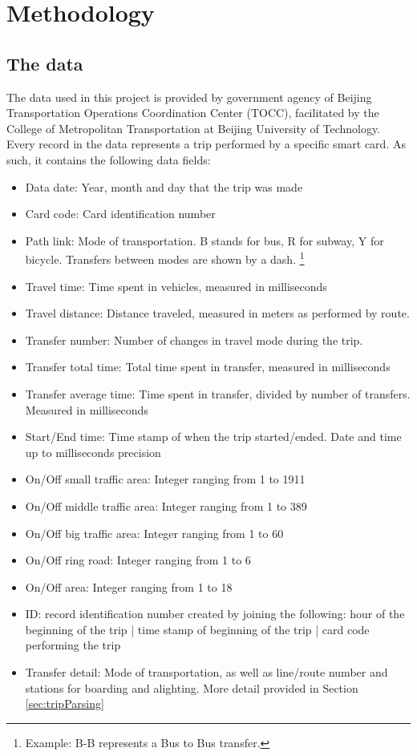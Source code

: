 \documentclass{article}
\begin{document}
\newpage
\section{Methodology}
\subsection{The data}
\label{sec:data}
The data used in this project is provided by government agency of Beijing Transportation Operations Coordination Center (TOCC), facilitated by the College of Metropolitan Transportation at Beijing University of Technology. Every record in the data represents a trip performed by a specific smart card. As such, it contains the following data fields:

\begin{itemize}
\item Data date: Year, month and day that the trip was made
\item Card code: Card identification number
\item Path link: Mode of transportation. B stands for bus, R for subway, Y for bicycle. Transfers between modes are shown by a dash. \footnote{Example: B-B represents a Bus to Bus transfer.} 
\item Travel time: Time spent in vehicles, measured in milliseconds
\item Travel distance: Distance traveled, measured in meters as performed by route. 
\item Transfer number: Number of changes in travel mode during the trip. 
\item Transfer total time: Total time spent in transfer, measured in milliseconds\item Transfer average time: Time spent in transfer, divided by number of transfers. Measured in milliseconds
\item Start/End time: Time stamp of when the trip started/ended. Date and time up to milliseconds precision
\item On/Off small traffic area: Integer ranging from 1 to 1911
\item On/Off middle traffic area: Integer ranging from 1 to 389
\item On/Off big traffic area: Integer ranging from 1 to 60
\item On/Off ring road: Integer ranging from 1 to 6
\item On/Off area: Integer ranging from 1 to 18
\item ID: record identification number created by joining the following: hour of the beginning of the trip | time stamp of beginning of the trip | card code performing the trip
\item Transfer detail: Mode of transportation, as well as line/route number and stations for boarding and alighting. More detail provided in Section \ref{sec:tripParsing}
\end{itemize}
\end{document}
